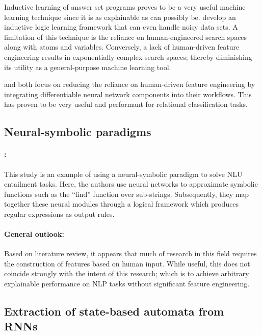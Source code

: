 Inductive learning of answer set programs proves to be a very useful machine learning technique since it is as explainable as can possibly be. \citet{law2015ilasp} develop an inductive logic learning framework that can even handle noisy data sets. A limitation of this technique is the reliance on human-engineered search spaces along with atoms and variables. Conversely, a lack of human-driven feature engineering results in exponentially complex search spaces; thereby diminishing its utility as a general-purpose machine learning tool.

\citet{evans2018learning} and \citet{DBLP:journals/corr/abs-1906-03523} both focus on reducing the reliance on human-driven feature engineering by integrating differentiable neural network components into their workflows. This has proven to be very useful and performant for relational classification tasks.

\subsection{Neural-symbolic paradigms}

\paragraph{\citealt{li2018generalize}:} This study is an example of using a neural-symbolic paradigm to solve NLU entailment tasks. Here, the authors use neural networks to approximate symbolic functions such as the ``find'' function over sub-strings. Subsequently, they map together these neural modules through a logical framework which produces regular expressions as output rules.

\paragraph{General outlook:} Based on literature review, it appears that much of research in this field requires the construction of features based on human input. While useful, this does not coincide strongly with the intent of this research; which is to achieve arbitrary explainable performance on NLP tasks without significant feature engineering.

\subsection{Extraction of state-based automata from RNNs}


